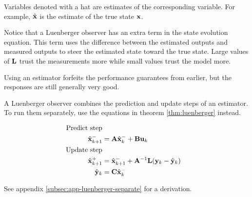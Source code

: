 Variables denoted with a hat are estimates of the corresponding variable. For
example, $\hat{\mathbf{x}}$ is the estimate of the true state $\mathbf{x}$.

Notice that a Luenberger observer has an extra term in the state evolution
equation. This term uses the difference between the estimated outputs and
measured outputs to steer the estimated state toward the true state. Large
values of $\mathbf{L}$ trust the measurements more while small values trust the
model more.

\begin{remark}
  Using an estimator forfeits the performance guarantees from earlier, but the
  responses are still generally very good.
\end{remark}

A Luenberger observer combines the prediction and update steps of an estimator.
To run them separately, use the equations in theorem \ref{thm:luenberger}
instead.

\begin{theorem}
  \begin{align}
    \text{Predict step} \nonumber \\
    \hat{\mathbf{x}}_{k+1}^- &= \mathbf{A}\hat{\mathbf{x}}_k^- + \mathbf{B}\mathbf{u}_k \\
    \text{Update step} \nonumber \\
    \hat{\mathbf{x}}_{k+1}^+ &= \hat{\mathbf{x}}_{k+1}^- + \mathbf{A}^{-1}\mathbf{L}
      (\mathbf{y}_k - \hat{\mathbf{y}}_k) \\
    \hat{\mathbf{y}}_k &= \mathbf{C} \hat{\mathbf{x}}_k^-
  \end{align}
  \label{thm:luenberger}
\end{theorem}

See appendix \ref{subsec:app-luenberger-separate} for a derivation.
